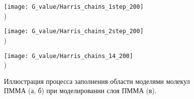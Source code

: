 \begin{figure}[t!]
	\begin{minipage}{0.48\textwidth}
		\texttt{[image: G\_value/Harris\_chains\_1step\_200]}
		\vspace{-14.2em} \\ ) \\ \vspace{14.2em}
	\end{minipage}
	\begin{minipage}{0.48\textwidth}
		\texttt{[image: G\_value/Harris\_chains\_2step\_200]}
		\vspace{-14.2em} \\ ) \\ \vspace{14.2em}
	\end{minipage}
	\vspace{-3.5em}
	\begin{center}
		\texttt{[image: G\_value/Harris\_chains\_14\_200]}
		\vspace{-13em} \\ ) \\ \vspace{13em}
	\end{center}
	\vspace{-1.5em}
	\caption{Иллюстрация процесса заполнения области моделями молекул ПММА (а, б) при моделировании слоя ПММА (в).}
	\label{fig:Harris_chains}
\end{figure}

